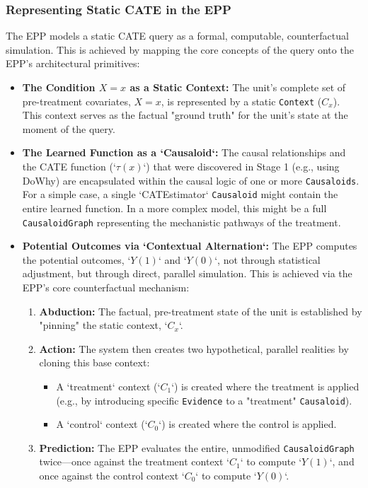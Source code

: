 \subsubsection*{Representing Static CATE in the EPP}

The EPP models a static CATE query as a formal, computable, counterfactual simulation. This is achieved by mapping the core concepts of the query onto the EPP's architectural primitives:

\begin{itemize}
\item \textbf{The Condition $X=x$ as a Static Context:}
The unit's complete set of pre-treatment covariates, $X=x$, is represented by a static \texttt{Context} ($C_x$). This context serves as the factual "ground truth" for the unit's state at the moment of the query.

\item \textbf{The Learned Function as a `Causaloid`:}
The causal relationships and the CATE function (`$\tau(x)$`) that were discovered in Stage 1 (e.g., using DoWhy) are encapsulated within the causal logic of one or more \texttt{Causaloids}. For a simple case, a single `CATEstimator` \texttt{Causaloid} might contain the entire learned function. In a more complex model, this might be a full \texttt{CausaloidGraph} representing the mechanistic pathways of the treatment.

\item \textbf{Potential Outcomes via `Contextual Alternation`:}
The EPP computes the potential outcomes, `$Y(1)$` and `$Y(0)$`, not through statistical adjustment, but through direct, parallel simulation. This is achieved via the EPP's core counterfactual mechanism:
\begin{enumerate}
    \item \textbf{Abduction:} The factual, pre-treatment state of the unit is established by "pinning" the static context, `$C_x$`.
    \item \textbf{Action:} The system then creates two hypothetical, parallel realities by cloning this base context:
        \begin{itemize}
            \item A `treatment` context (`$C_1$`) is created where the treatment is applied (e.g., by introducing specific \texttt{Evidence} to a "treatment" \texttt{Causaloid}).
            \item A `control` context (`$C_0$`) is created where the control is applied.
        \end{itemize}
    \item \textbf{Prediction:} The EPP evaluates the entire, unmodified \texttt{CausaloidGraph} twice—once against the treatment context `$C_1$` to compute `$Y(1)$`, and once against the control context `$C_0$` to compute `$Y(0)$`.
\end{enumerate}


\end{itemize}
